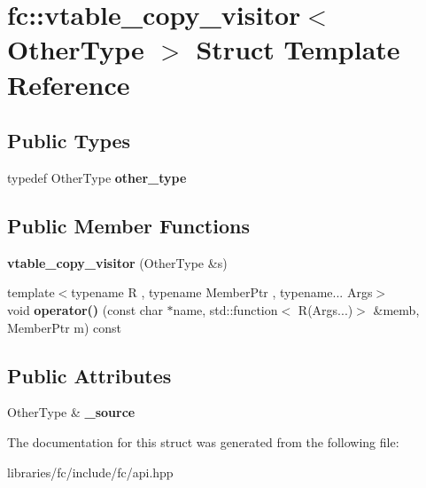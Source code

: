 \hypertarget{structfc_1_1vtable__copy__visitor}{}\section{fc\+:\+:vtable\+\_\+copy\+\_\+visitor$<$ Other\+Type $>$ Struct Template Reference}
\label{structfc_1_1vtable__copy__visitor}
\subsection*{Public Types}
\begin{DoxyCompactItemize}
\item 
\mbox{\label{structfc_1_1vtable__copy__visitor_a3ed5251e0472006d10afdc92c9c06358}} 
typedef Other\+Type {\bfseries other\+\_\+type}
\end{DoxyCompactItemize}
\subsection*{Public Member Functions}
\begin{DoxyCompactItemize}
\item 
\mbox{\label{structfc_1_1vtable__copy__visitor_a6a3feeed69edef79c950faa852c6fed9}} 
{\bfseries vtable\+\_\+copy\+\_\+visitor} (Other\+Type \&s)
\item 
\mbox{\label{structfc_1_1vtable__copy__visitor_a8f21e689d562619f58ced3f8a0ef8c00}} 
{\footnotesize template$<$typename R , typename Member\+Ptr , typename... Args$>$ }\\void {\bfseries operator()} (const char $\ast$name, std\+::function$<$ R(Args...)$>$ \&memb, Member\+Ptr m) const
\end{DoxyCompactItemize}
\subsection*{Public Attributes}
\begin{DoxyCompactItemize}
\item 
\mbox{\label{structfc_1_1vtable__copy__visitor_a1feff63c4724f4c192b76522f5f81aed}} 
Other\+Type \& {\bfseries \+\_\+source}
\end{DoxyCompactItemize}


The documentation for this struct was generated from the following file\+:\begin{DoxyCompactItemize}
\item 
libraries/fc/include/fc/api.\+hpp\end{DoxyCompactItemize}
